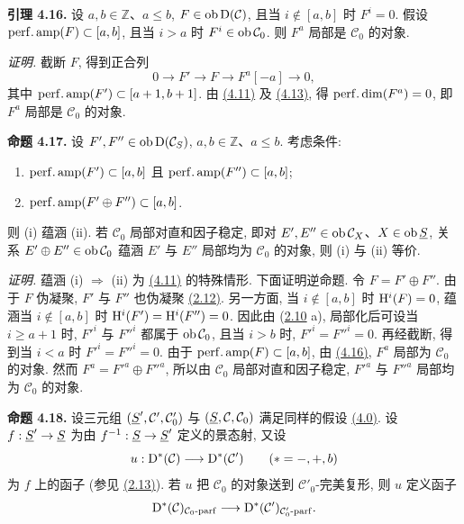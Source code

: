 \textbf{引理 4.16.} 设 \(a,b\in\mathbb Z\)、\(a\leq b\), \(F\in\operatorname{ob}\mathrm D(\mathcal C)\), 且当 \(i\notin[a,b]\) 时 \(F^i=0\). 假设 \(\operatorname{perf.amp}(F)\subset[a,b]\), 且当 \(i>a\) 时 \(F^i\in\operatorname{ob}\mathcal C_0\). 则 \(F^a\) 局部是 \(\mathcal C_0\) 的对象.

\emph{证明.} 截断 \(F\), 得到正合列
\[
  0\longrightarrow F'\longrightarrow F\longrightarrow F^a[-a]\longrightarrow 0,
\]
其中 \(\operatorname{perf.amp}(F')\subset[a+1,b+1]\). 由 \hyperlink{sga6.e01.complement.4-11}{(4.11)} 及 \hyperlink{sga6.e01.lem.4-13}{(4.13)}, 得 \(\operatorname{perf.dim}(F^a)=0\), 即 \(F^a\) 局部是 \(\mathcal C_0\) 的对象.

\textbf{命题 4.17.} 设 \(F',F''\in\operatorname{ob}\mathrm D(\mathcal C_S)\), \(a,b\in\mathbb Z\)、\(a\leq b\). 考虑条件:
\begin{enumerate}[label=(\roman*)]
\item \(\operatorname{perf.amp}(F')\subset[a,b]\) 且 \(\operatorname{perf.amp}(F'')\subset[a,b]\);
\item \(\operatorname{perf.amp}(F'\oplus F'')\subset[a,b]\).
\end{enumerate}
则 (i) 蕴涵 (ii). 若 \(\mathcal C_0\) 局部对直和因子稳定, 即对 \(E',E''\in\operatorname{ob}\mathcal C_X\)、\(X\in\operatorname{ob}\underline S\), 关系 \(E'\oplus E''\in\operatorname{ob}\mathcal C_0\) 蕴涵 \(E'\) 与 \(E''\) 局部均为 \(\mathcal C_0\) 的对象, 则 (i) 与 (ii) 等价.

\emph{证明.} 蕴涵 (i) \(\Rightarrow\) (ii) 为 \hyperlink{sga6.e01.complement.4-11}{(4.11)} 的特殊情形. 下面证明逆命题. 令 \(F=F'\oplus F''\). 由于 \(F\) 伪凝聚, \(F'\) 与 \(F''\) 也伪凝聚 \hyperlink{sga6.e01.prop.2-12}{(2.12)}. 另一方面, 当 \(i\notin[a,b]\) 时 \(\mathrm H^i(F)=0\), 蕴涵当 \(i\notin[a,b]\) 时 \(\mathrm H^i(F')=\mathrm H^i(F'')=0\). 因此由 (\hyperlink{sga6.e01.prop.2-10}{2.10} a), 局部化后可设当 \(i\geq a+1\) 时, \(F'^i\) 与 \(F''^i\) 都属于 \(\operatorname{ob}\mathcal C_0\), 且当 \(i>b\) 时, \(F'^i=F''^i=0\). 再经截断, 得到当 \(i<a\) 时 \(F'^i=F''^i=0\). 由于 \(\operatorname{perf.amp}(F)\subset[a,b]\), 由 \hyperlink{sga6.e01.lem.4-16}{(4.16)}, \(F^a\) 局部为 \(\mathcal C_0\) 的对象. 然而 \(F^a=F'^a\oplus F''^a\), 所以由 \(\mathcal C_0\) 局部对直和因子稳定, \(F'^a\) 与 \(F''^a\) 局部均为 \(\mathcal C_0\) 的对象.

\textbf{命题 4.18.} 设三元组 \((\underline S',\mathcal C',\mathcal C'_0)\) 与 \((\underline S,\mathcal C,\mathcal C_0)\) 满足同样的假设 \hyperlink{sga6.e01.para.4-0}{(4.0)}. 设 \(f:\underline S'\to\underline S\) 为由 \(f^{-1}:\underline S\to\underline S'\) 定义的景态射, 又设
\[
  u:\mathrm D^*(\mathcal C)\longrightarrow \mathrm D^*(\mathcal C')\qquad (*=-,+,b)
\]
为 \(f\) 上的函子 (参见 \hyperlink{sga6.e01.prop.2-13}{(2.13)}). 若 \(u\) 把 \(\mathcal C_0\) 的对象送到 \(\mathcal C'_0\)-完美复形, 则 \(u\) 定义函子
\[
  \mathrm D^*(\mathcal C)_{\mathcal C_0\text{-}\mathrm{parf}}
  \longrightarrow
  \mathrm D^*(\mathcal C')_{\mathcal C'_0\text{-}\mathrm{parf}}.
\]

